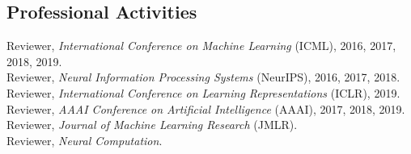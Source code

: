 \documentclass{article}
\begin{document}


\subsection*{Professional Activities}
Reviewer, \emph{International Conference on Machine Learning} (ICML), 2016, 2017, 2018, 2019. \\
Reviewer, \emph{Neural Information Processing Systems} (NeurIPS), 2016, 2017, 2018. \\
Reviewer, \emph{International Conference on Learning Representations} (ICLR), 2019. \\
Reviewer, \emph{AAAI Conference on Artificial Intelligence} (AAAI), 2017, 2018, 2019. \\
Reviewer, \emph{Journal of Machine Learning Research} (JMLR). \\
Reviewer, \emph{Neural Computation}.
\end{document}
